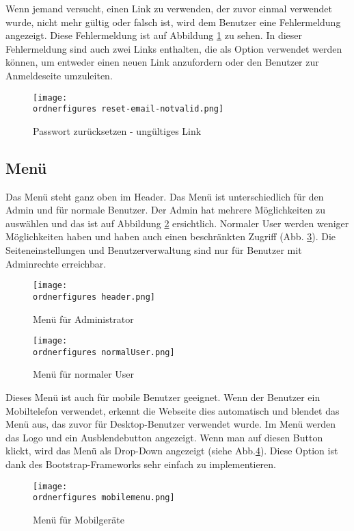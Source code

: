 Wenn jemand versucht, einen Link zu verwenden, der zuvor einmal verwendet wurde, nicht mehr gültig oder falsch ist, wird dem Benutzer eine Fehlermeldung angezeigt. Diese Fehlermeldung ist auf Abbildung \ref{fi:invalidlink} zu sehen. In dieser Fehlermeldung sind auch zwei Links enthalten, die als Option verwendet werden können, um entweder einen neuen Link anzufordern oder den Benutzer zur Anmeldeseite umzuleiten.



\begin{figure}[H]
	\centering
	\texttt{[image: \\ordnerfigures reset-email-notvalid.png]}
	\caption{Passwort zurücksetzen - ungültiges Link}
	\label{fi:invalidlink}
\end{figure}


\subsection{Menü}

Das Menü steht ganz oben im Header. Das Menü ist unterschiedlich für den Admin und für normale Benutzer. Der Admin hat mehrere Möglichkeiten zu auswählen und das ist auf Abbildung \ref{fi:menu} ersichtlich. Normaler User werden weniger Möglichkeiten haben und haben auch einen beschränkten Zugriff (Abb. \ref{fi:normalerUser}). Die Seiteneinstellungen und Benutzerverwaltung sind nur für Benutzer mit Adminrechte erreichbar. 

\begin{figure}[H]
	\centering
	\texttt{[image: \\ordnerfigures header.png]}
	\caption{Men\"u für Administrator}
	\label{fi:menu}
\end{figure}

\begin{figure}[H]
	\centering
	\texttt{[image: \\ordnerfigures normalUser.png]}
	\caption{Men\"u für normaler User}
	\label{fi:normalerUser}
\end{figure}

Dieses Menü ist auch für mobile Benutzer geeignet. Wenn der Benutzer ein Mobiltelefon verwendet, erkennt die Webseite dies automatisch und blendet das Menü aus, das zuvor für Desktop-Benutzer verwendet wurde. Im Menü werden das Logo und ein Ausblendebutton angezeigt. Wenn man auf diesen Button klickt, wird das Menü als Drop-Down angezeigt (siehe Abb.\ref{fi:mobilemenu}). Diese Option ist dank des Bootstrap-Frameworks sehr einfach zu implementieren.
	
\begin{figure}[H]
	\centering
	\texttt{[image: \\ordnerfigures mobilemenu.png]}
	\caption{Men\"u für Mobilgeräte}
	\label{fi:mobilemenu}
\end{figure}

